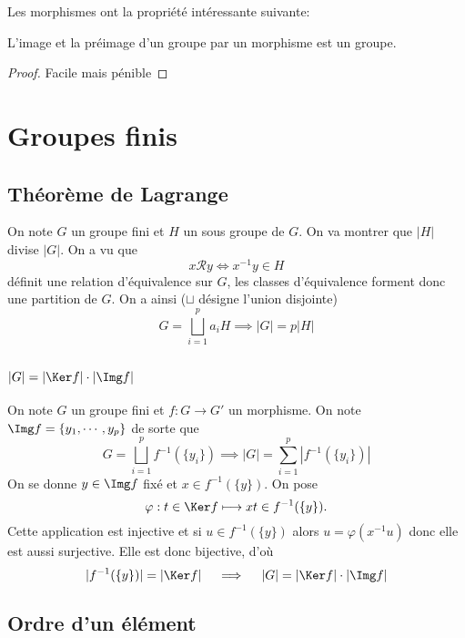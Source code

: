 Les morphismes ont la propriété intéressante suivante:

\begin{prop}
    L'image et la préimage d'un groupe par un morphisme est un groupe.
\end{prop}

\begin{proof}
    Facile mais pénible
\end{proof}

\section{Groupes finis}

\subsection{Théorème de Lagrange}


On note $G$ un groupe fini et $H$ un sous groupe de $G$. On va montrer que $|H|$ divise $|G|$. On a vu que \[
    x\mathcal Ry\iff x^{-1}y\in H
\]
définit une relation d'équivalence sur $G$, les classes d'équivalence forment donc une partition de $G$. On a ainsi ($\sqcup$ désigne l'union disjointe) \[
    G=\bigsqcup_{i=1}^p a_iH \implies |G|=p|H|
\]

\subsection{\texorpdfstring{$|G|=|\Ker f|\cdot |\Img f|$}{\#G=\#Ker f × \#Im f}}

On note $G$ un groupe fini et $f:G\to G'$ un morphisme. On note $\Img f=\{y_1, \cdots, y_p\}$ de sorte que \[
    G=\bigsqcup_{i=1}^p f^{-1}(\{y_i\}) \implies |G|=\sum_{i=1}^p \left| f^{-1}(\{y_i\}) \right|
\]
On se donne $y\in \Img f$ fixé et $x\in f^{-1}(\{y\})$. On pose \[
    \varphi: t\in \Ker f\longmapsto xt\in f^{-1}(\{y\}).
\]
Cette application est injective et si $u\in f^{-1}(\{y\})$ alors $u=\varphi(x^{-1}u)$ donc elle est aussi surjective. Elle est donc bijective, d'où \[
    |f^{-1}(\{y\})|=|\Ker f|\quad \implies \quad |G|=|\Ker f|\cdot |\Img f|
\]

\subsection{Ordre d'un élément}

